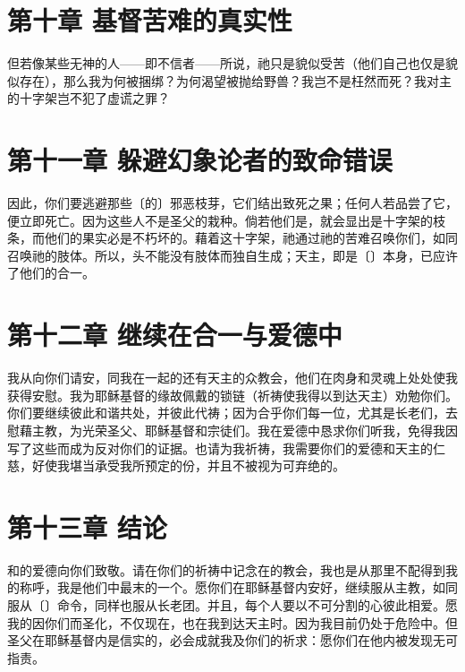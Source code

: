 \section{第十章 基督苦难的真实性}

但若像某些无神的人——即不信者——所说，祂只是貌似受苦（他们自己也仅是貌似存在），那么我为何被捆绑？为何渴望被抛给野兽？我岂不是枉然而死？我对主的十字架岂不犯了虚谎之罪？\par


\section{第十一章 躲避幻象论者的致命错误}

因此，你们要逃避那些〔的〕邪恶枝芽，它们结出致死之果；任何人若品尝了它，便立即死亡。因为这些人不是圣父的栽种。倘若他们是，就会显出是十字架的枝条，而他们的果实必是不朽坏的。藉着这十字架，祂通过祂的苦难召唤你们，如同召唤祂的肢体。所以，头不能没有肢体而独自生成；天主，即是〔〕本身，已应许了他们的合一。\par


\section{第十二章 继续在合一与爱德中}

我从向你们请安，同我在一起的还有天主的众教会，他们在肉身和灵魂上处处使我获得安慰。我为耶稣基督的缘故佩戴的锁链（祈祷使我得以到达天主）劝勉你们。你们要继续彼此和谐共处，并彼此代祷；因为合乎你们每一位，尤其是长老们，去慰藉主教，为光荣圣父、耶稣基督和宗徒们。我在爱德中恳求你们听我，免得我因写了这些而成为反对你们的证据。也请为我祈祷，我需要你们的爱德和天主的仁慈，好使我堪当承受我所预定的份，并且不被视为可弃绝的。\par


\section{第十三章 结论}

和的爱德向你们致敬。请在你们的祈祷中记念在的教会，我也是从那里不配得到我的称呼，我是他们中最末的一个。愿你们在耶稣基督内安好，继续服从主教，如同服从〔〕命令，同样也服从长老团。并且，每个人要以不可分割的心彼此相爱。愿我的因你们而圣化，不仅现在，也在我到达天主时。因为我目前仍处于危险中。但圣父在耶稣基督内是信实的，必会成就我及你们的祈求：愿你们在他内被发现无可指责。\par

